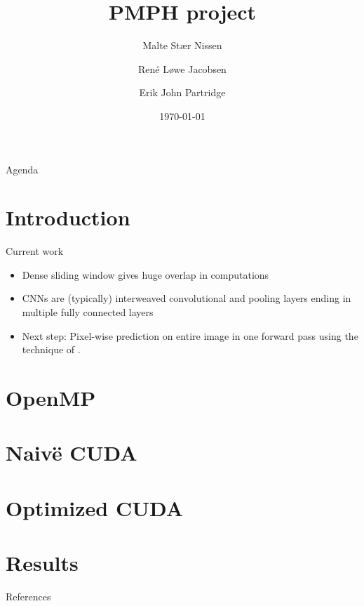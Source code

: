 \documentclass[14pt,t,english]{beamer}
\title{PMPH project}
\author[Malte Stær Nissen, René Løwe Jacobsen, and Erik John Partridge]{Malte Stær Nissen \\\and René Løwe Jacobsen \\\and Erik John Partridge}
\institute{Department of Computer Science}
\date[]{\today}
\begin{document}
%
\frame[plain]{\titlepage}
%
\begin{frame}{Agenda}
	\tableofcontents
\end{frame}
%
\section{Introduction}
\begin{frame}[c]{Current work}
\begin{itemize}
	\vfill
	\item Dense sliding window gives huge overlap in computations
	\vfill
	\item CNNs are (typically) interweaved convolutional and pooling layers ending in multiple fully connected layers
	\vfill
	\item Next step: Pixel-wise prediction on entire image in one forward pass using the technique of \citet{giusti2013fast}.
	\vfill
\end{itemize}
\end{frame}
\section{OpenMP}
\section{Naiv\"e CUDA}
\section{Optimized CUDA}
\section{Results}


%


\begin{frame}{References}
\ghostframe
\printbibliography
\end{frame}
\end{document}

